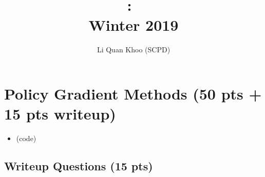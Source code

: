 \documentclass{article}
\title{
\vspace{-1in}
\textmd{\textbf{\hmwkClass:\ \hmwkTitle\\
Winter 2019}}}
\author{ Li Quan Khoo (SCPD) }
\date{} %
\begin{document}
\maketitle
\vspace{-.5in}


\section{Policy Gradient Methods (50 pts + 15 pts writeup)}

\begin{itemize}
\item(code)
\end{itemize} 

\subsection{Writeup Questions (15 pts)}
\end{document}
